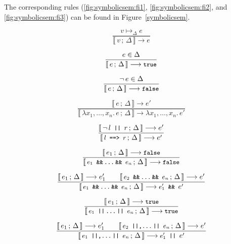 \documentclass[a4paper,twoside]{article}
\newcommand{\lb}[2]{\llbracket\, #1\,;\, #2\, \rrbracket}
\newcommand{\RefFig}[1]{Figure~\ref{#1}}
\newcommand{\stt}[1]{\texttt{\small{#1}}}
\begin{document}
The corresponding rules (\ref{fig:symbolicsem:fi1}, \ref{fig:symbolicsem:fi2}, and \ref{fig:symbolicsem:fi3}) can be found in \RefFig{symbolicsem}.

\begin{figure}[htb]
\begin{framed}

\begin{equation}
\dfrac{
  v \mapsto_\Delta e
}{
  \lb{v}{\Delta} \longrightarrow e
}
\end{equation}
 
\begin{equation}
\dfrac{
  e \in \Delta
}{
  \lb{e}{\Delta} \longrightarrow \stt{true}
}
\end{equation}

\begin{equation}
\dfrac{
  \neg\, e \in \Delta
}{
  \lb{e}{\Delta} \longrightarrow \stt{false}
}
\end{equation}

\begin{equation}
\dfrac{
  \lb{e}{\Delta} \longrightarrow e'
}{
  \lb{\lambda x_1, \ldots, x_n.\, e}{\Delta} \longrightarrow \lambda x_1, \ldots, x_n.\, e'
}
\end{equation}

\begin{equation}
\dfrac{
  \lb{\neg\,l \stt{ || } r}{\Delta} \longrightarrow e'
}{
  \lb{\stt{$l$ ==> $r$}}{\Delta} \longrightarrow e'
}
\end{equation}

\begin{equation}
\dfrac{
  \lb{e_1}{\Delta} \longrightarrow \stt{false}
}{
  \lb{\stt{$e_1$ \&\&\,\ldots\,\&\& $e_n$}}{\Delta} \longrightarrow \stt{false}
}
\end{equation}

\begin{equation}
\dfrac{
  \lb{e_1}{\Delta} \longrightarrow e_1' \qquad
  \lb{\stt{$e_2$ \&\&\,\ldots\,\&\& $e_n$}}{\Delta} \longrightarrow e'
}{
  \lb{\stt{$e_1$ \&\&\,\ldots\,\&\& $e_n$}}{\Delta} \longrightarrow \stt{$e_1'$ \&\& } e' 
}
\end{equation}

\begin{equation}
\dfrac{
  \lb{e_1}{\Delta} \longrightarrow \stt{true}
}{
  \lb{\stt{$e_1$ ||\,\ldots\,|| $e_n$}}{\Delta} \longrightarrow \stt{true}
}
\end{equation}

\begin{equation}
\dfrac{
  \lb{e_1}{\Delta} \longrightarrow e_1' \qquad
  \lb{\stt{$e_2$ ||,\ldots\,|| $e_n$}}{\Delta} \longrightarrow e'
}{
  \lb{\stt{$e_1$ ||,\ldots\,|| $e_n$}}{\Delta} \longrightarrow \stt{$e_1'$ || } e'
}
\end{equation}


\end{framed}
\end{figure}
\end{document}
